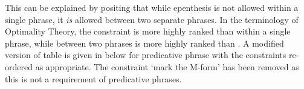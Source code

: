 \begin{multicols}{2}
	\begin{exe}
		\label{ex:muqit-amnasiq}
		\label{ex:muqi-mnasiq}
	\end{exe}
\end{multicols}
\begin{multicols}{2}
	\begin{exe}
		\label{tr:muqit-amnasiq}
		\label{tr:muqi-mnasiq}
	\end{exe}
\end{multicols}

This can be explained by positing that while epenthesis
is not allowed within a single phrase,
it \emph{is} allowed between two separate phrases.
In the terminology of Optimality Theory,
the constraint  is more highly ranked than  within a single phrase,
while between two phrases  is more highly ranked than .
A modified version of table 
is given in  below for predicative phrase
with the constraints re-ordered as appropriate.
The constraint \tsc{\M} `mark the M-form' has been removed as
this is not a requirement of predicative phrases.

